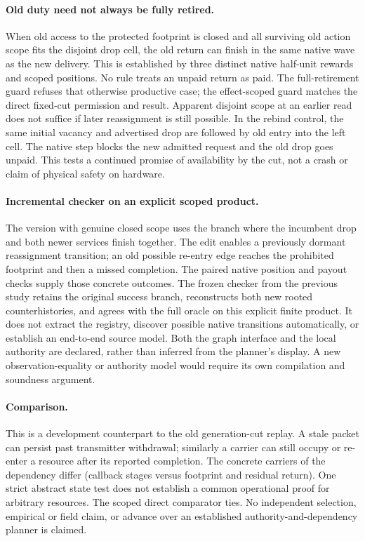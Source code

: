 \documentclass{article}
\begin{document}
\paragraph{Old duty need not always be fully retired.}
When old access to the protected footprint is closed and all surviving
old action scope fits the disjoint drop cell, the old return can finish
in the same native wave as the new delivery. This is established by
three distinct native half-unit rewards and scoped positions.
No rule treats an unpaid return as paid. The full-retirement guard
refuses that otherwise productive case; the effect-scoped guard
matches the direct fixed-cut permission and result. Apparent disjoint
scope at an earlier read does not suffice if later reassignment is
still possible. In the rebind control, the same initial vacancy and
advertised drop are followed by old entry into the left cell. The
native step blocks the new admitted request and the old drop goes unpaid.
This tests a continued promise of availability by the cut, not a crash
or claim of physical safety on hardware.

\paragraph{Incremental checker on an explicit scoped product.}
The version with genuine closed scope uses the branch where the incumbent
drop and both newer services finish together. The edit enables a
previously dormant reassignment transition; an old possible re-entry
edge reaches the prohibited footprint and then a missed completion.
The paired native position and payout checks supply those concrete
outcomes. The frozen checker from the previous study retains the original
success branch, reconstructs both new rooted counterhistories, and agrees
with the full oracle on this explicit finite product. It does not
extract the registry, discover possible native transitions automatically,
or establish an end-to-end source model. Both the graph interface and the
local authority are declared, rather than inferred from the planner's
display. A new observation-equality or authority model would require its
own compilation and soundness argument.

\paragraph{Comparison.}
This is a development counterpart to the old generation-cut replay.
A stale packet can persist past transmitter withdrawal; similarly
a carrier can still occupy or re-enter a resource after its reported
completion. The concrete carriers of the dependency differ
(callback stages versus footprint and residual return). One strict
abstract state test does not establish a common operational proof for
arbitrary resources. The scoped direct comparator ties.
No independent selection, empirical or field claim, or advance over
an established authority-and-dependency planner is claimed.
\end{document}
